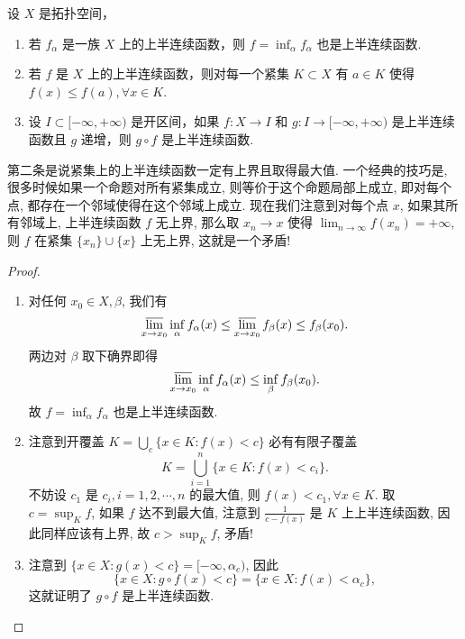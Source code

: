 \documentclass[lang=cn,newtx,10pt,scheme=chinese]{elegantbook}
\begin{document}
\begin{proposition}[上半连续函数基本性质]\label{proposition:上半连续函数基本性质}
设 \(X\) 是拓扑空间，
\begin{enumerate}
\item 若 \(f_{\alpha}\) 是一族 \(X\) 上的上半连续函数，则 \(f = \inf_{\alpha} f_{\alpha}\) 也是上半连续函数.
\item 若 \(f\) 是 \(X\) 上的上半连续函数，则对每一个紧集 \(K \subset X\) 有 \(a \in K\) 使得 \(f(x) \leq f(a),\forall x \in K\).
\item 设 \(I \subset [-\infty,+\infty)\) 是开区间，如果 \(f: X \to I\) 和 \(g: I \to [-\infty,+\infty)\) 是上半连续函数且 \(g\) 递增，则 \(g \circ f\) 是上半连续函数.
\end{enumerate}
\end{proposition}
\begin{note}
第二条是说紧集上的上半连续函数一定有上界且取得最大值. 一个经典的技巧是, 很多时候如果一个命题对所有紧集成立, 则等价于这个命题局部上成立, 即对每个点, 都存在一个邻域使得在这个邻域上成立. 现在我们注意到对每个点 \(x\), 如果其所有邻域上, 上半连续函数 \(f\) 无上界, 那么取 \(x_{n}\to x\) 使得 \(\lim_{n \to \infty}f(x_{n}) = +\infty\), 则 \(f\) 在紧集 \(\{x_{n}\}\cup\{x\}\) 上无上界, 这就是一个矛盾!
\end{note}
\begin{proof}
\begin{enumerate}
\item 对任何 \(x_{0}\in X,\beta\), 我们有
\[
\varlimsup_{x \to x_{0}}\inf_{\alpha}f_{\alpha}(x)\leq\varlimsup_{x \to x_{0}}f_{\beta}(x)\leq f_{\beta}(x_{0}).
\]
两边对 \(\beta\) 取下确界即得
\[
\varlimsup_{x \to x_{0}}\inf_{\alpha}f_{\alpha}(x)\leq\inf_{\beta}f_{\beta}(x_{0}).
\]
故 \(f = \inf_{\alpha}f_{\alpha}\) 也是上半连续函数.

\item 注意到开覆盖 \(K=\bigcup_{c}\{x\in K:f(x)<c\}\) 必有有限子覆盖
\[
K=\bigcup_{i = 1}^{n}\{x\in K:f(x)<c_{i}\}.
\]
不妨设 \(c_{1}\) 是 \(c_{i},i = 1,2,\cdots,n\) 的最大值, 则 \(f(x)<c_{1},\forall x\in K\). 取 \(c=\sup_{K}f\), 如果 \(f\) 达不到最大值, 注意到 \(\frac{1}{c - f(x)}\) 是 \(K\) 上上半连续函数, 因此同样应该有上界, 故 \(c>\sup_{K}f\), 矛盾! 

\item 注意到 \(\{x\in X:g(x)<c\}=[-\infty,\alpha_{c})\), 因此
\[
\{x\in X:g\circ f(x)<c\}=\{x\in X:f(x)<\alpha_{c}\},
\]
这就证明了 \(g\circ f\) 是上半连续函数.
\end{enumerate}
\end{proof}
\end{document}
